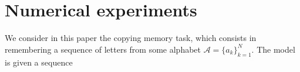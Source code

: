 \documentclass{article}
\begin{document}
\section{Numerical experiments} \label{sec:numerics}


We consider in this paper the copying memory task, which consists in remembering a sequence of letters from some alphabet $\mathcal{A} = \{ a_k\}_{k = 1}^N$. The model is given a sequence
\end{document}
